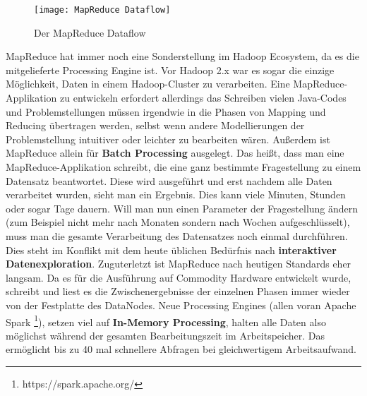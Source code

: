 \begin{figure}[ht]
    \centering
    \texttt{[image: MapReduce Dataflow]}
    \caption[Der MapReduce Dataflow]{Der MapReduce Dataflow\parencite[Seite 24, Figure 2-1]{white_hadoop_2015}}
    \label{fig:mapred dataflow}
\end{figure}

MapReduce hat immer noch eine Sonderstellung im Hadoop Ecosystem, da es die mitgelieferte Processing Engine ist. Vor Hadoop 2.x war es sogar die einzige Möglichkeit, Daten in einem Hadoop-Cluster zu verarbeiten. Eine MapReduce-Applikation zu entwickeln erfordert allerdings das Schreiben vielen Java-Codes und Problemstellungen müssen irgendwie in die Phasen von Mapping und Reducing übertragen werden, selbst wenn andere Modellierungen der Problemstellung intuitiver oder leichter zu bearbeiten wären. Außerdem ist MapReduce allein für \textbf{Batch Processing} ausgelegt. Das heißt, dass man eine MapReduce-Applikation schreibt, die eine ganz bestimmte Fragestellung zu einem Datensatz beantwortet. Diese wird ausgeführt und erst nachdem alle Daten verarbeitet wurden, sieht man ein Ergebnis. Dies kann viele Minuten, Stunden oder sogar Tage dauern. Will man nun einen Parameter der Fragestellung ändern (zum Beispiel nicht mehr nach Monaten sondern nach Wochen aufgeschlüsselt), muss man die gesamte Verarbeitung des Datensatzes noch einmal durchführen. Dies steht im Konflikt mit dem heute üblichen Bedürfnis nach \textbf{interaktiver Datenexploration}. Zuguterletzt ist MapReduce nach heutigen Standards eher langsam. Da es für die Ausführung auf Commodity Hardware entwickelt wurde, schreibt und liest es die Zwischenergebnisse der einzelnen Phasen immer wieder von der Festplatte des DataNodes. Neue Processing Engines (allen voran Apache Spark \footnote{https://spark.apache.org/}), setzen viel auf \textbf{In-Memory Processing}, halten alle Daten also möglichst während der gesamten Bearbeitungszeit im Arbeitspeicher. Das ermöglicht bis zu 40 mal schnellere Abfragen bei gleichwertigem Arbeitsaufwand. \cite[vgl.][Kap. 3.19]{freiknecht_big_2018} 

